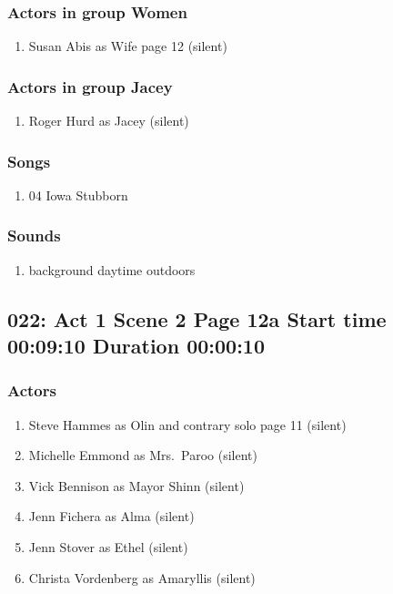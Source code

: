 \subsubsection{Actors in group Women}
\begin{enumerate}
\item Susan Abis as Wife page 12 (silent)
\end{enumerate}
\subsubsection{Actors in group Jacey}
\begin{enumerate}
\item Roger Hurd as Jacey (silent)
\end{enumerate}

\subsubsection{Songs}
\begin{enumerate}
\item 04 Iowa Stubborn
\end{enumerate}\subsubsection{Sounds}
\begin{enumerate}
\item background daytime outdoors
\end{enumerate}
\subsection{022: Act 1 Scene 2 Page 12a Start time 00:09:10 Duration 00:00:10}

\subsubsection{Actors}
\begin{enumerate}
\item Steve Hammes as Olin and contrary solo page 11 (silent)
\item Michelle Emmond as Mrs.~Paroo (silent)
\item Vick Bennison as Mayor Shinn (silent)
\item Jenn Fichera as Alma (silent)
\item Jenn Stover as Ethel (silent)
\item Christa Vordenberg as Amaryllis (silent)
\end{enumerate}
